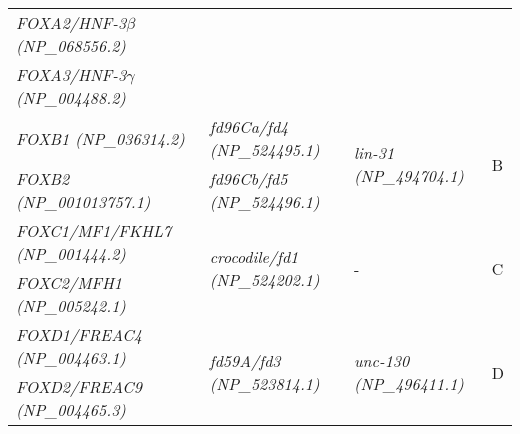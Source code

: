 \documentclass[../main.tex]{subfiles}
\begin{document}
\begin{longtable}{llll}
	\textit{FOXA2/HNF-3$\beta$ (NP\_068556.2)}              &                                                                                                        &                                                                                                    &                       \\
	\textit{FOXA3/HNF-3$\gamma$ (NP\_004488.2)}             &                                                                                                        &                                                                                                    &                       \\ [0.2cm]
	\textit{FOXB1 (NP\_036314.2)}                           & \textit{fd96Ca/fd4 (NP\_524495.1)}                                                                     & \multirow{2}{*}{\textit{lin-31 (NP\_494704.1)}}                                                    & \multirow{2}{*}{B}    \\
	\textit{FOXB2 (NP\_001013757.1)}                        & \textit{fd96Cb/fd5 (NP\_524496.1)}                                                                     &                                                                                                    &                       \\ [0.2cm]
	\textit{FOXC1/MF1/FKHL7 (NP\_001444.2)}                 & \multirow{2}{*}{\textit{crocodile/fd1 (NP\_524202.1)}}                                                 & \multirow{2}{*}{-}                                                                                 & \multirow{2}{*}{C}    \\
	\textit{FOXC2/MFH1 (NP\_005242.1)}                      &                                                                                                        &                                                                                                    &                       \\ [0.2cm]
	\textit{FOXD1/FREAC4 (NP\_004463.1)}                    & \multirow{4}{*}{\textit{fd59A/fd3 (NP\_523814.1)}}                                                     & \multirow{4}{*}{\textit{unc-130 (NP\_496411.1)}}                                                   & \multirow{4}{*}{D}    \\
	\textit{FOXD2/FREAC9 (NP\_004465.3)}                    &                                                                                                        &                                                                                                    &                       \\

\end{longtable}
\end{document}
